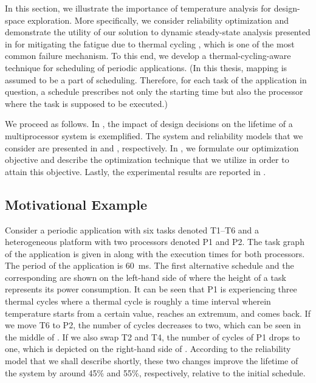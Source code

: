 In this section, we illustrate the importance of temperature analysis for
design-space exploration. More specifically, we consider reliability
optimization and demonstrate the utility of our solution to dynamic steady-state
analysis presented in  for mitigating the
fatigue due to thermal cycling \cite{jedec2010}, which is one of the most common
failure mechanism. To this end, we develop a thermal-cycling-aware technique for
scheduling of periodic applications. (In this thesis, mapping is assumed to be a
part of scheduling. Therefore, for each task of the application in question, a
schedule prescribes not only the starting time but also the processor where the
task is supposed to be executed.)

We proceed as follows. In , the impact of
design decisions on the lifetime of a multiprocessor system is exemplified. The
system and reliability models that we consider are presented in
 and , respectively. In
, we formulate our optimization objective and
describe the optimization technique that we utilize in order to attain this
objective. Lastly, the experimental results are reported in
.

\subsection{Motivational Example}

Consider a periodic application with six tasks denoted T1--T6 and a
heterogeneous platform with two processors denoted P1 and P2. The task graph of
the application is given in  along with the
execution times for both processors. The period of the application is 60~ms. The
first alternative schedule and the corresponding  are shown on the
left-hand side of  where the height of a task
represents its power consumption. It can be seen that P1 is experiencing three
thermal cycles where a thermal cycle is roughly a time interval wherein
temperature starts from a certain value, reaches an extremum, and comes back. If
we move T6 to P2, the number of cycles decreases to two, which can be seen in
the middle of . If we also swap T2 and T4, the
number of cycles of P1 drops to one, which is depicted on the right-hand side of
. According to the reliability model that we
shall describe shortly, these two changes improve the lifetime of the system by
around 45\% and 55\%, respectively, relative to the initial schedule.

